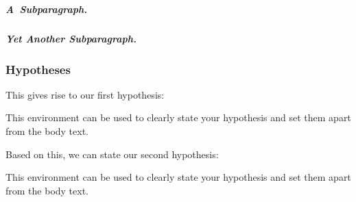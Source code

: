 \subparagraph{A~Subparagraph.}
\blindtext

\subparagraph{Yet Another Subparagraph.}
\blindtext

\subsubsection{Hypotheses}
\blindtext
This gives rise to our first hypothesis:

\begin{hypothesis} \label{hy:UNBAL}
This environment can be used to clearly state your hypothesis and set them apart from the body text.
\end{hypothesis}

\blindtext
Based on this, we can state our second hypothesis:

\begin{hypothesis} \label{hy:UNBAL_2}
This environment can be used to clearly state your hypothesis and set them apart from the body text.
\end{hypothesis}

\blindtext
